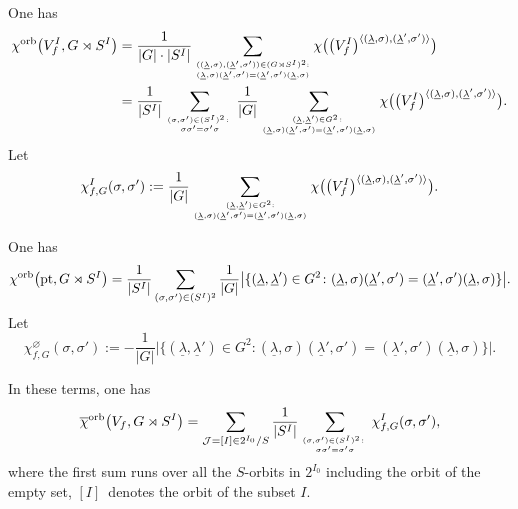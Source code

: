 \documentclass[pdftex]{sigma}
\numberwithin{equation}{section}
\begin{document}
One has
\begin{align*}
{\chi}^{\rm orb}\big(V_f^I, G\rtimes S^I\big) & =\frac{1}{\vert G\vert\cdot\vert S^I\vert}
 \sum_{{((\underline{\lambda},\sigma),(\underline{\lambda}',\sigma'))\in (G\rtimes S^I)^2:}\atop
 {(\underline{\lambda},\sigma)(\underline{\lambda}',\sigma')=
 (\underline{\lambda}',\sigma')(\underline{\lambda},\sigma)}}
 \chi\big(\big(V_f^I\big)^{\langle(\underline{\lambda},\sigma),(\underline{\lambda}',\sigma')\rangle}\big)\\
 &= \frac{1}{\vert S^I\vert}\sum_{{(\sigma,\sigma')\in (S^I)^2\colon}\atop {\sigma\sigma'=\sigma'\sigma}}
 \frac{1}{\vert G\vert}
 \sum_{{(\underline{\lambda},\underline{\lambda}')\in G^2\colon }\atop
 {(\underline{\lambda},\sigma)(\underline{\lambda}',\sigma')=
 (\underline{\lambda}',\sigma')(\underline{\lambda},\sigma)}}
 \chi\big(\big(V_f^I\big)^{\langle(\underline{\lambda},\sigma),(\underline{\lambda}',\sigma')\rangle}\big).
\end{align*}
Let
\begin{gather}\label{eqn:chi_sigma}
 \chi_{f,G}^I(\sigma,\sigma'):=\frac{1}{\vert G\vert}
 \sum_{{(\underline{\lambda},\underline{\lambda}')\in G^2:}\atop
 {(\underline{\lambda},\sigma)(\underline{\lambda}',\sigma')=
 (\underline{\lambda}',\sigma')(\underline{\lambda},\sigma)}}
 \chi\big(\big(V_f^I\big)^{\langle(\underline{\lambda},\sigma),(\underline{\lambda}',\sigma')\rangle}\big).
\end{gather}

One has
\begin{gather*}
 {\chi}^{\rm orb}\big({\rm pt}, G\rtimes S^I\big) = \frac{1}{\vert S^I\vert}\sum_{(\sigma,\sigma')\in (S^I)^2}
\frac{1}{\vert G\vert}\big\vert\{(\underline{\lambda},\underline{\lambda}')\in G^2\colon
(\underline{\lambda},\sigma)(\underline{\lambda}',\sigma') =(\underline{\lambda}',\sigma')(\underline{\lambda},\sigma)
\}\big\vert.
\end{gather*}
Let
\[
 \chi_{f,G}^{\varnothing}(\sigma,\sigma'):= - \frac{1}{\vert G\vert}\big\vert\{(\underline{\lambda},\underline{\lambda}')
 \in G^2\colon
(\underline{\lambda},\sigma)(\underline{\lambda}',\sigma') =(\underline{\lambda}',\sigma')(\underline{\lambda},\sigma)
\}\big\vert.
\]

In these terms, one has
\begin{gather} \label{eqn:chi_f,G}
{\overline{\chi}}^{ \rm orb}\big(V_f, G\rtimes S^I\big) =
\sum_{{\mathcal J}=[I]\in 2^{I_0}/S} \frac{1}{\vert S^I\vert}
\sum_{{(\sigma,\sigma')\in (S^I)^2\colon }\atop {\sigma\sigma'=\sigma'\sigma}} \chi^I_{f,G}(\sigma, \sigma'),
\end{gather}
where the first sum runs over all the $S$-orbits in $2^{I_0}$ including the orbit of the empty set,
$[I]$~denotes the orbit of the subset $I$.
\end{document}

